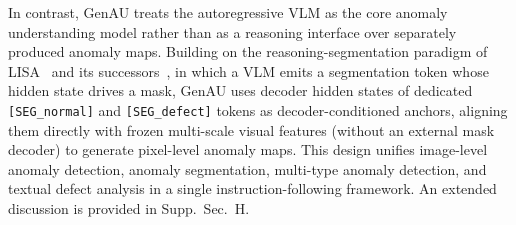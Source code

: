 In contrast, GenAU treats the autoregressive VLM as the core anomaly understanding model rather than as a reasoning interface over separately produced anomaly maps. Building on the reasoning-segmentation paradigm of LISA~\cite{lai2024lisareasoningsegmentationlarge} and its successors~\cite{rasheed2024glamm,ren2024pixellm}, in which a VLM emits a segmentation token whose hidden state drives a mask, GenAU uses decoder hidden states of dedicated \texttt{[SEG\_normal]} and \texttt{[SEG\_defect]} tokens as decoder-conditioned anchors, aligning them directly with frozen multi-scale visual features (without an external mask decoder) to generate pixel-level anomaly maps. This design unifies image-level anomaly detection, anomaly segmentation, multi-type anomaly detection, and textual defect analysis in a single instruction-following framework. An extended discussion is provided in Supp.~Sec.~H.


